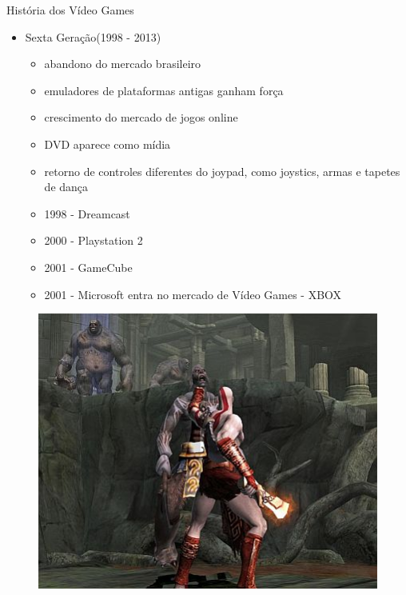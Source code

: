 \documentclass[xcolor=svgnames,handout]{beamer}
\begin{document}
\begin{frame}{História dos Vídeo Games}
\begin{itemize}
	\item Sexta Geração(1998 - 2013)\pause
	\begin{itemize}
	\item abandono do mercado brasileiro\pause
	\item emuladores de plataformas antigas ganham força\pause
	\item crescimento do mercado de jogos online\pause
	\item DVD aparece como mídia\pause
	\item retorno de controles diferentes do joypad, como joystics, armas e tapetes de dança\pause
	\item 1998 - Dreamcast\pause
	\item 2000 - Playstation 2\pause
	\item 2001 - GameCube\pause
	\item 2001 - Microsoft entra no mercado de Vídeo Games - XBOX\pause
	\end{itemize}
\end{itemize}
		\begin{figure}[t]
	    \centering
		    \includegraphics[scale=0.3]{imagens/gow2}
		\end{figure}
\end{frame}
\end{document}
